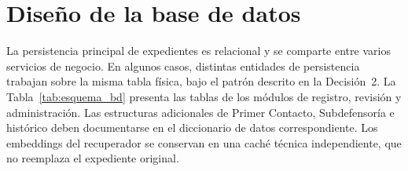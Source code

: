	\section{Diseño de la base de datos}
	\label{sec:diseno_bd}
	La persistencia principal de expedientes es relacional y se comparte entre varios servicios
	de negocio. En algunos casos, distintas entidades de persistencia trabajan sobre la misma
	tabla física, bajo el patrón descrito en la Decisión~2. La
	Tabla~\ref{tab:esquema_bd} presenta las tablas de los módulos de registro, revisión y
	administración. Las estructuras adicionales de Primer Contacto, Subdefensoría e histórico
	deben documentarse en el diccionario de datos correspondiente. Los embeddings del recuperador
	se conservan en una caché técnica independiente, que no reemplaza el expediente original.
	
	
	\small
	\renewcommand{\arraystretch}{1.25}
	\setlength{\tabcolsep}{4pt}
	
